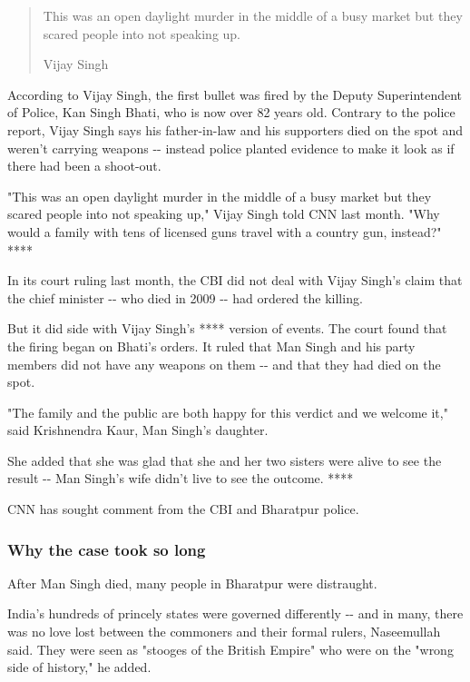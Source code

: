 \begin{quote}
This was an open daylight murder in the middle of a busy market but they
scared people into not speaking up.

Vijay Singh
\end{quote}

According to Vijay Singh, the first bullet was fired by the Deputy
Superintendent of Police, Kan Singh Bhati, who is now over 82 years old.
Contrary to the police report, Vijay Singh says his father-in-law and
his supporters died on the spot and weren't carrying weapons -\/-
instead police planted evidence to make it look as if there had been a
shoot-out.

"This was an open daylight murder in the middle of a busy market but
they scared people into not speaking up," Vijay Singh told CNN last
month. "Why would a family with tens of licensed guns travel with a
country gun, instead?" ****

In its court ruling last month, the CBI did not deal with Vijay Singh's
claim that the chief minister -\/- who died in 2009 -\/- had ordered the
killing.

But it did side with Vijay Singh's **** version of events. The court
found that the firing began on Bhati's orders. It ruled that Man Singh
and his party members did not have any weapons on them -\/- and that
they had died on the spot.

"The family and the public are both happy for this verdict and we
welcome it," said Krishnendra Kaur, Man Singh's daughter.

She added that she was glad that she and her two sisters were alive to
see the result -\/- Man Singh's wife didn't live to see the outcome.
****

CNN has sought comment from the CBI and Bharatpur police.

\hypertarget{why-the-case-took-so-long}{%
\subsubsection{Why the case took so
long}\label{why-the-case-took-so-long}}

After Man Singh died, many people in Bharatpur were distraught.

India's hundreds of princely states were governed differently -\/- and
in many, there was no love lost between the commoners and their formal
rulers, Naseemullah said. They were seen as "stooges of the British
Empire" who were on the "wrong side of history," he added.

